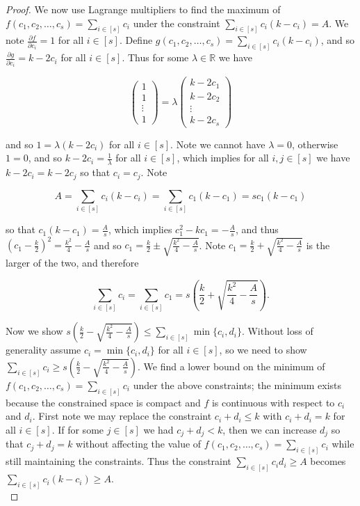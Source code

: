 \documentclass{article}
\begin{document}
\begin{proof}
We now use Lagrange multipliers to find the maximum of  $f(c_1,c_2,\ldots,c_s) = \sum_{i \in [s]} c_i$ under the constraint $\sum_{i \in [s]} c_i(k-c_i) = A$. We note $\frac{\partial f}{\partial c_i} = 1$ for all $i \in [s]$. Define $g(c_1,c_2,\ldots,c_s) = \sum_{i \in [s]} c_i(k-c_i)$, and so $\frac{\partial g}{\partial c_i} = k - 2c_i$ for all $i \in [s]$. Thus for some $\lambda \in \mathbb{R}$ we have

$$
\begin{pmatrix}
1 \\
1 \\
\vdots \\
1
\end{pmatrix} = 
\lambda 
\begin{pmatrix}
k-2c_1 \\
k-2c_2 \\
\vdots \\
k-2c_s
\end{pmatrix}
$$

\noindent
and so $1 = \lambda(k-2c_i)$ for all $i \in [s]$. Note we cannot have $\lambda = 0$, otherwise $1 = 0$, and so $k-2c_i = \frac{1}{\lambda}$ for all $i \in [s]$, which implies for all $i,j \in [s]$ we have $k-2c_i = k-2c_j$ so that $c_i = c_j$. Note

$$A = \sum_{i \in [s]} c_i(k-c_i) = \sum_{i \in [s]} c_1(k-c_1) = sc_1(k-c_1)$$

so that $c_1(k-c_1) = \frac{A}{s}$, which implies $c_1^2 - kc_1 = -\frac{A}{s}$, and thus $(c_1 - \frac{k}{2})^2 = \frac{k^2}{4} - \frac{A}{s}$ and so $c_1 = \frac{k}{2} \pm \sqrt{\frac{k^2}{4}-\frac{A}{s}}$. Note $c_1 =  \frac{k}{2} + \sqrt{\frac{k^2}{4}-\frac{A}{s}}$ is the larger of the two, and therefore

$$\sum_{i \in [s]} c_i = \sum_{i \in [s]} c_1 = s(\frac{k}{2} + \sqrt{\frac{k^2}{4}-\frac{A}{s}}).$$

Now we show $s(\frac{k}{2} - \sqrt{\frac{k^2}{4}-\frac{A}{s}}) \leq \sum_{i \in [s]} \min\{c_i,d_i\}$. Without loss of generality assume $c_i = \min\{c_i,d_i\}$ for all $i \in [s]$, so we need to show $\sum_{i \in [s]} c_i \geq s(\frac{k}{2} - \sqrt{\frac{k^2}{4}-\frac{A}{s}})$. We find a lower bound on the minimum of $f(c_1,c_2,\ldots,c_s) = \sum_{i \in [s]} c_i$ under the above constraints; the minimum exists because the constrained space is compact and $f$ is continuous with respect to $c_i$ and $d_i$. First note we may replace the constraint $c_i + d_i \leq k$ with $c_i + d_i = k$ for all $i \in [s]$. If for some $j \in [s]$ we had $c_j+d_j < k$, then we can increase $d_j$ so that $c_j + d_j = k$ without affecting the value of $f(c_1,c_2,\ldots,c_s) = \sum_{i \in [s]} c_i$ while still maintaining the constraints. Thus the constraint $\sum_{i \in [s]} c_id_i \geq A$ becomes $\sum_{i \in [s]} c_i(k-c_i) \geq A$. \\


\end{proof}
\end{document}
